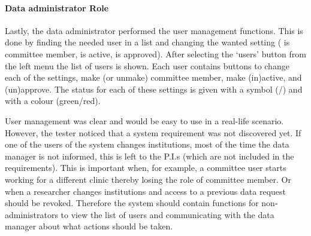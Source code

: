 \paragraph{Data administrator Role}
Lastly, the data administrator performed the user management functions.
This is done by finding the needed user in a list and changing the wanted setting (\ie{} is committee member, is active, is approved).
After selecting the `users' button from the left menu the list of users is shown. 
Each user contains buttons to change each of the settings, \ie{} make (or unmake) committee member, make (in)active, and (un)approve.
The status for each of these settings is given with a symbol (\checkmark{}/\texttimes{}) and with a colour (green/red).

User management was clear and would be easy to use in a real-life scenario.
However, the tester noticed that a system requirement was not discovered yet.
If one of the users of the system changes institutions, most of the time the data manager is not informed, this is left to the P.I.s (which are not included in the \ivfsystem{} requirements).
This is important when, for example, a committee user starts working for a different clinic thereby losing the role of committee member.
Or when a researcher changes institutions and access to a previous data request should be revoked.
Therefore the system should contain functions for non-administrators to view the list of users and communicating with the data manager about what actions should be taken.